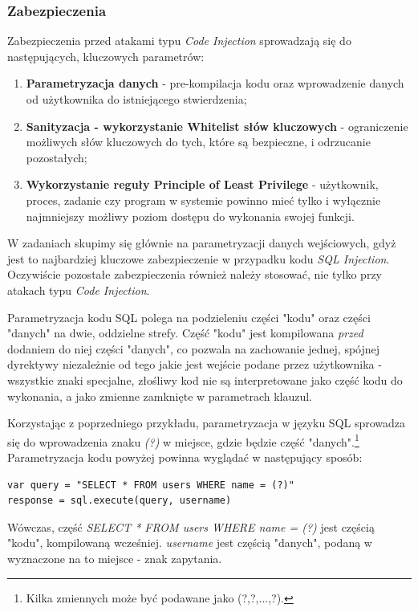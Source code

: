 \documentclass[12pt,a4paper]{article}
\begin{document}
\subsubsection{Zabezpieczenia}

Zabezpieczenia przed atakami typu \emph{Code Injection} sprowadzają się do następujących, kluczowych parametrów:
\begin{enumerate}
    \item \textbf{Parametryzacja danych} - pre-kompilacja kodu oraz wprowadzenie danych od użytkownika do istniejącego stwierdzenia; 
    \item \textbf{Sanityzacja - wykorzystanie Whitelist słów kluczowych} - ograniczenie możliwych słów kluczowych do tych, które są bezpieczne, i odrzucanie pozostałych;
    \item \textbf{Wykorzystanie reguły Principle of Least Privilege} - użytkownik, proces, zadanie czy program w systemie powinno mieć 
            tylko i wyłącznie najmniejszy możliwy poziom dostępu do wykonania swojej funkcji.
\end{enumerate}

W zadaniach skupimy się głównie na parametryzacji danych wejściowych, gdyż jest to najbardziej kluczowe zabezpieczenie w przypadku kodu
\emph{SQL Injection}. Oczywiście pozostałe zabezpieczenia również należy stosować, nie tylko przy atakach typu \emph{Code Injection}.

Parametryzacja kodu SQL polega na podzieleniu części "kodu" oraz części "danych" na dwie, oddzielne strefy.
Część "kodu" jest kompilowana \emph{przed} dodaniem do niej części "danych", co pozwala na zachowanie jednej, spójnej dyrektywy
niezależnie od tego jakie jest wejście podane przez użytkownika - wszystkie znaki specjalne, złośliwy kod nie są interpretowane 
jako część kodu do wykonania, a jako zmienne zamknięte w parametrach klauzul. 

Korzystając z poprzedniego przykładu, parametryzacja w języku SQL sprowadza się do wprowadzenia znaku \emph{(?)} w miejsce, gdzie będzie
część "danych".\footnote{Kilka zmiennych może być podawane jako (?,?,...,?).} Parametryzacja kodu powyżej powinna wyglądać w następujący 
sposób:
\begin{tcolorbox}
\begin{verbatim}
var query = "SELECT * FROM users WHERE name = (?)"
response = sql.execute(query, username)
\end{verbatim} 
\end{tcolorbox}

Wówczas, część \emph{SELECT * FROM users WHERE name = (?)} jest częścią "kodu", kompilowaną wcześniej. \emph{username} jest częścią "danych",
podaną w wyznaczone na to miejsce - znak zapytania.
\end{document}
